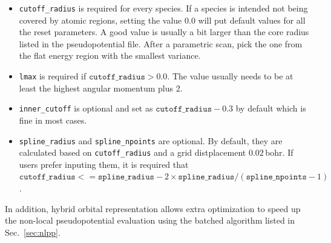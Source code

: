 \begin{itemize}
  \item \texttt{cutoff\_radius} is required for every species. If a species is intended not being covered by atomic regions, setting the value 0.0 will put default values for all the reset parameters. A good value is usually a bit larger than the core radius listed in the pseudopotential file. After a parametric scan, pick the one from the flat energy region with the smallest variance.
  \item \texttt{lmax} is required if $\texttt{cutoff\_radius} > 0.0$. The value usually needs to be at least the highest angular momentum plus 2.
  \item \texttt{inner\_cutoff} is optional and set as $\texttt{cutoff\_radius}-0.3$ by default which is fine in most cases.
  \item \texttt{spline\_radius} and \texttt{spline\_npoints} are optional. By default, they are calculated based on \texttt{cutoff\_radius} and a grid distplacement $0.02$\,bohr.
        If users prefer inputing them, it is required that $\texttt{cutoff\_radius}<=\texttt{spline\_radius}-2\times\texttt{spline\_radius}/(\texttt{spline\_npoints}-1)$.
\end{itemize}

In addition, hybrid orbital representation allows extra optimization to speed up the non-local pseudopotential evaluation using the batched algorithm listed in Sec.~\ref{sec:nlpp}.
